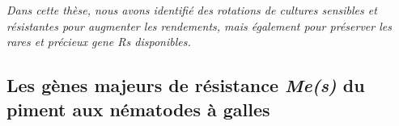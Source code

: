 \textit{
Dans cette thèse, nous avons identifié des rotations de cultures sensibles et résistantes pour augmenter les rendements, mais également pour préserver les rares et précieux \glspl{gene R} disponibles.}

\newpage
\subsection{Les gènes majeurs de résistance \textit{Me(s)} du piment aux nématodes à galles}

\label{sec:gene-R-piment}

